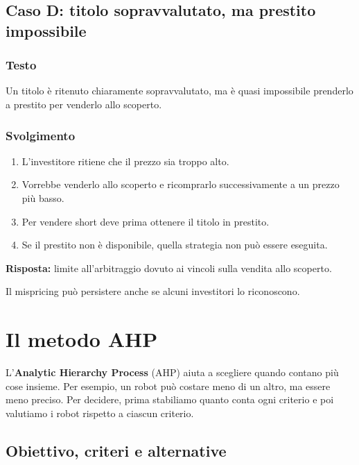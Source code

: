 \subsection{Caso D:
titolo sopravvalutato, ma prestito impossibile}

\subsubsection*{Testo}

\noindent Un titolo è ritenuto chiaramente
sopravvalutato, ma è quasi impossibile
prenderlo a prestito
per venderlo allo scoperto.


\subsubsection*{Svolgimento}

\begin{enumerate}
    \item L'investitore ritiene
    che il prezzo sia troppo alto.

    \item Vorrebbe venderlo allo scoperto
    e ricomprarlo successivamente
    a un prezzo più basso.

    \item Per vendere short
    deve prima ottenere il titolo in prestito.

    \item Se il prestito non è disponibile,
    quella strategia non può essere eseguita.
\end{enumerate}

\noindent \textbf{Risposta:}
limite all'arbitraggio dovuto
ai vincoli sulla vendita allo scoperto.

\noindent Il mispricing può persistere
anche se alcuni investitori
lo riconoscono.
\section{Il metodo AHP}

\noindent L'\textbf{Analytic Hierarchy Process} (AHP) aiuta a scegliere
quando contano più cose insieme. Per esempio, un robot può costare meno
di un altro, ma essere meno preciso. Per decidere, prima stabiliamo quanto
conta ogni criterio e poi valutiamo i robot rispetto a ciascun criterio.

\subsection*{Obiettivo, criteri e alternative}

